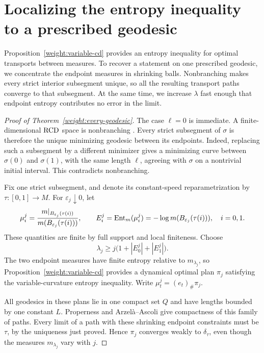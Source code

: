 \section{Localizing the entropy inequality to a prescribed geodesic}
\label{sec:every-geodesic}

Proposition~\ref{weight:variable-cd} provides an entropy inequality
for optimal transports between measures. To recover a statement on
one prescribed geodesic, we concentrate the endpoint measures in
shrinking balls. Nonbranching makes every strict interior subsegment
unique, so all the resulting transport paths converge to that
subsegment. At the same time, we increase \(\lambda\) fast enough
that endpoint entropy contributes no error in the limit.

\begin{proof}[Proof of Theorem~\ref{weight:every-geodesic}]
The case \(\ell=0\) is immediate. A finite-dimensional
\(\mathrm{RCD}\) space is nonbranching \cite[Theorem~1.3]{Deng2020}.
Every strict subsegment of \(\sigma\) is therefore the unique
minimizing geodesic between its endpoints. Indeed, replacing
such a subsegment by a different minimizer gives a minimizing
curve between \(\sigma(0)\) and \(\sigma(1)\), with the same
length \(\ell\), agreeing with \(\sigma\) on a nontrivial
initial interval. This contradicts nonbranching.

Fix one strict subsegment, and denote its constant-speed
reparametrization by \(\tau\colon[0,1]\to M\).
For \(\varepsilon_j\downarrow0\), let
\[
\mu_i^j=\frac{m|_{B_{\varepsilon_j}(\tau(i))}}
                  {m(B_{\varepsilon_j}(\tau(i)))},\qquad
E_i^j=\operatorname{Ent}_m(\mu_i^j)
     =-\log m(B_{\varepsilon_j}(\tau(i))),\quad i=0,1.
\]
These quantities are finite by full support and local finiteness.
Choose
\[
\lambda_j\ge j\bigl(1+|E_0^j|+|E_1^j|\bigr).
\]
The two endpoint measures have finite entropy relative to
\(m_{\lambda_j}\), so Proposition~\ref{weight:variable-cd}
provides a dynamical optimal plan \(\pi_j\) satisfying the
variable-curvature entropy inequality. Write
\(\mu_t^j=(e_t)_\#\pi_j\).

All geodesics in these plans lie in one compact set \(Q\) and
have lengths bounded by one constant \(L\). Properness and
Arzel\`a--Ascoli give compactness of this family of paths.
Every limit of a path with these shrinking endpoint constraints
must be \(\tau\), by the uniqueness just proved. Hence
\(\pi_j\) converges weakly to \(\delta_\tau\), even though
the measures \(m_{\lambda_j}\) vary with \(j\).


\end{proof}
